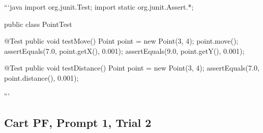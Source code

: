 \begin{response}
```java
import org.junit.Test;
import static org.junit.Assert.*;

public class PointTest {

    @Test
    public void testMove() {
        Point point = new Point(3, 4);
        point.move();
        assertEquals(7.0, point.getX(), 0.001);
        assertEquals(9.0, point.getY(), 0.001);
    }

    @Test
    public void testDistance() {
        Point point = new Point(3, 4);
        assertEquals(7.0, point.distance(), 0.001);
    }
}
```
\end{response}

\subsection{Cart PF, Prompt 1, Trial 2}

